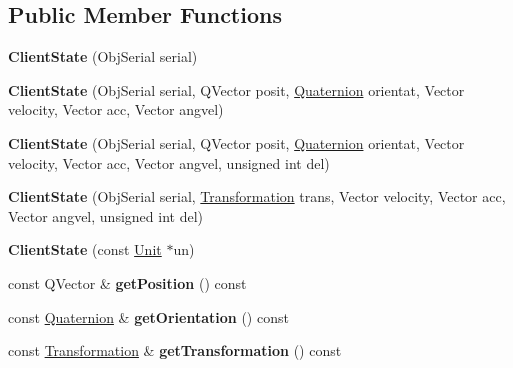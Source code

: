 \subsection*{Public Member Functions}
\begin{DoxyCompactItemize}
\item 
{\bfseries Client\+State} (Obj\+Serial serial)\hypertarget{classClientState_a36ce0b4082f863a287dfa736373cd147}{}\label{classClientState_a36ce0b4082f863a287dfa736373cd147}

\item 
{\bfseries Client\+State} (Obj\+Serial serial, Q\+Vector posit, \hyperlink{structQuaternion}{Quaternion} orientat, Vector velocity, Vector acc, Vector angvel)\hypertarget{classClientState_a02ac64fb525dbbbe20a7c7279654da36}{}\label{classClientState_a02ac64fb525dbbbe20a7c7279654da36}

\item 
{\bfseries Client\+State} (Obj\+Serial serial, Q\+Vector posit, \hyperlink{structQuaternion}{Quaternion} orientat, Vector velocity, Vector acc, Vector angvel, unsigned int del)\hypertarget{classClientState_a33110642d240550f91d826993dcd1c8f}{}\label{classClientState_a33110642d240550f91d826993dcd1c8f}

\item 
{\bfseries Client\+State} (Obj\+Serial serial, \hyperlink{structTransformation}{Transformation} trans, Vector velocity, Vector acc, Vector angvel, unsigned int del)\hypertarget{classClientState_a3ef93e711477b55aa9f53d00102522a7}{}\label{classClientState_a3ef93e711477b55aa9f53d00102522a7}

\item 
{\bfseries Client\+State} (const \hyperlink{classUnit}{Unit} $\ast$un)\hypertarget{classClientState_a10fd14df81ed7ca8201d9ece333d75a6}{}\label{classClientState_a10fd14df81ed7ca8201d9ece333d75a6}

\item 
const Q\+Vector \& {\bfseries get\+Position} () const \hypertarget{classClientState_a01eea88cbe8349abcc6588fffe2d83bc}{}\label{classClientState_a01eea88cbe8349abcc6588fffe2d83bc}

\item 
const \hyperlink{structQuaternion}{Quaternion} \& {\bfseries get\+Orientation} () const \hypertarget{classClientState_aba1129a9a378551e0587c4c421056ad7}{}\label{classClientState_aba1129a9a378551e0587c4c421056ad7}

\item 
const \hyperlink{structTransformation}{Transformation} \& {\bfseries get\+Transformation} () const \hypertarget{classClientState_af288a074bd60b7bdfbf23d668a15fe63}{}\label{classClientState_af288a074bd60b7bdfbf23d668a15fe63}


\end{DoxyCompactItemize}

